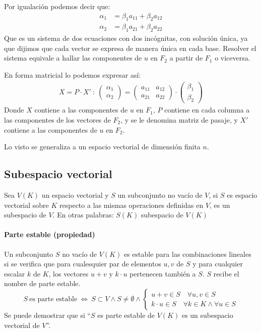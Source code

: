 Por igualación podemos decir que:
\begin{align*}
  \alpha_1 &= \beta_1 a_{11} + \beta_2 a_{12} \\ 
  \alpha_2 &= \beta_1 a_{21} + \beta_2 a_{22}
\end{align*}
Que es un sistema de dos ecuaciones con dos incógnitas, con solución única, ya que dijimos que cada vector se expresa de manera única en cada base. Resolver el sistema equivale a hallar las componentes de \(u\) en \(F_2\) a partir de \(F_1\) o viceversa.

En forma matricial lo podemos expresar así:
\begin{align*}
  X = P \cdot X' ~ : ~ \begin{pmatrix}
    \alpha_1 \\ \alpha_2
  \end{pmatrix} = \begin{pmatrix}
    a_{11} & a_{12} \\ 
    a_{21} & a_{22}
  \end{pmatrix} \cdot \begin{pmatrix}
    \beta_1 \\ \beta_2
  \end{pmatrix}
\end{align*}
Donde \(X\) contiene a las componentes de \(u\) en \(F_1\), \(P\) contiene en cada columna a las componentes de los vectores de \(F_2\), y se le denomina matriz de pasaje, y \(X'\) contiene a las componentes de \(u\) en \(F_2\).

Lo visto se generaliza a un espacio vectorial de dimensión finita \(n\).

\subsection{Subespacio vectorial}

Sea \(V(K)\) un espacio vectorial y \(S\) un subconjunto no vacío de \(V\), si \(S\) es espacio vectorial sobre \(K\) respecto a las mismas operaciones definidas en \(V\), es un subespacio de \(V\). En otras palabras: \(S(K)\) subespacio de \(V(K)\)

\paragraph{Parte estable (propiedad)}

Un subconjunto \(S\) no vacío de \(V(K)\) es estable para las combinaciones lineales si se verifica que para cualesquier par de elementos \(u,v\) de \(S\) y para cualquier escalar \(k\) de \(K\), los vectores \(u+v\) y \(k\cdot u\) pertenecen también a \(S\). \(S\) recibe el nombre de parte estable.
\[
  S ~ \text{es parte estable} ~ \Longleftrightarrow ~ S \subset V \land S \neq \emptyset \land \begin{cases}
    u + v \in S \quad \forall u, v \in S\\
    k \cdot u \in S \quad \forall k \in K \land \forall u \in S
  \end{cases}
\]
Se puede demostrar que si ``\(S\) es parte estable de \(V(K)\) es un subespacio vectorial de \(V\)''.

